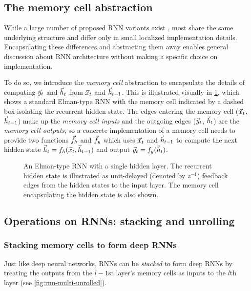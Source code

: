 \subsection{The memory cell abstraction}

While a large number of proposed RNN variants exist
\citep{elman1990finding,jordan1997serial,hochreiter1997long,cho2014learning,Koutnik2014,Mikolov2015},
most share the same underlying structure and differ only in small localized
implementation details. Encapsulating these differences and abstracting them
away enables general discussion about RNN architecture without making a
specific choice on implementation.

To do so, we introduce the \emph{memory cell} abstraction to encapsulate the
details of computing $\vec{y}_t$ and $\vec{h}_t$ from $\vec{x}_t$ and $\vec{h}_{t-1}$. This is
illustrated visually in \cref{fig:rnn-elman}, which shows a standard Elman-type
RNN \citep{elman1990finding} with the memory cell indicated by a dashed box
isolating the recurrent hidden state. The edges entering the memory cell
($\vec{x}_t$, $\vec{h}_{t-1}$) make up the \emph{memory cell inputs} and the outgoing
edges ($\vec{y}_t$, $\vec{h}_t$) are the \emph{memory cell outputs}, so a concrete
implementation of a memory cell needs to provide two functions $\vec{f}_h$ and
$\vec{f}_y$ which uses $\vec{x}_t$ and $\vec{h}_{t-1}$ to compute the next hidden state $\vec{h}_t
= f_h(\vec{x}_t, \vec{h}_{t-1})$ and output $\vec{y}_t = f_y(\vec{h}_t)$.

\begin{figure}[tb]
  \centering
  
  \caption{An Elman-type RNN with a single hidden layer. The recurrent hidden
    state is illustrated as unit-delayed (denoted by $z^{-1}$) feedback edges
    from the hidden states to the input layer. The memory cell encapsulating the
  hidden state is also shown.}
  \label{fig:rnn-elman}
\end{figure}

\subsection{Operations on RNNs: stacking and unrolling}

\subsubsection{Stacking memory cells to form deep RNNs}

Just like deep neural networks, RNNs can be \emph{stacked} to form deep RNNs
\citep{el1995hierarchical,schmidhuber1992learning} by treating the
outputs from the $l-1$st layer's memory cells as inputs to the $l$th layer (see \cref{fig:rnn-multi-unrolled}).

